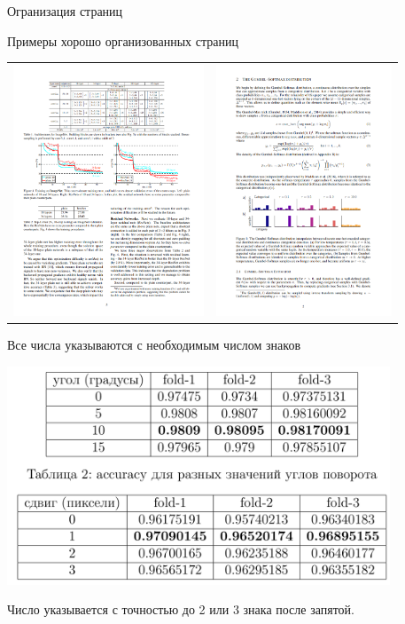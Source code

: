 \documentclass[fleqn, xcolor=x11names]{beamer}
\begin{document}
\begin{section}{Огранизация страниц}
\begin{frame}{Примеры хорошо организованных страниц}
	\begin{center}
		\begin{tabular}{ll}
			\includegraphics[height=7.5cm]{good_formatting.png} & \includegraphics[height=7.5cm]{good_formatting_2.png}
		\end{tabular}
	\end{center}
\end{frame}

\end{section}

\begin{frame}{Все числа указываются с необходимым числом знаков}
    \begin{center}
        {\includegraphics[height=6.5cm]{bad_numbers.png}}
    \end{center}
    Число указывается с точностью до 2 или 3 знака после запятой.
\end{frame}
\end{document}
